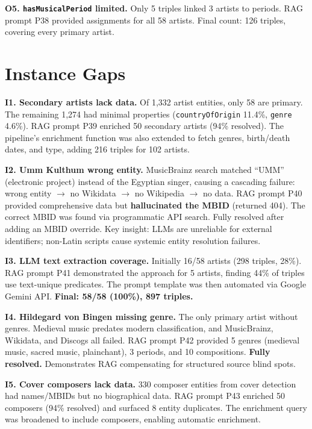 \documentclass[11pt,a4paper]{article}
\begin{document}
\textbf{O5. \texttt{hasMusicalPeriod} limited.} Only 5 triples linked 3 artists to periods. RAG prompt P38 provided assignments for all 58 artists. Final count: 126 triples, covering every primary artist.

\section{Instance Gaps}

\textbf{I1. Secondary artists lack data.} Of 1,332 artist entities, only 58 are primary. The remaining 1,274 had minimal properties (\texttt{countryOfOrigin} 11.4\%, \texttt{genre} 4.6\%). RAG prompt P39 enriched 50 secondary artists (94\% resolved). The pipeline's enrichment function was also extended to fetch genres, birth/death dates, and type, adding 216 triples for 102 artists.

\textbf{I2. Umm Kulthum wrong entity.} MusicBrainz search matched ``UMM'' (electronic project) instead of the Egyptian singer, causing a cascading failure: wrong entity $\rightarrow$ no Wikidata $\rightarrow$ no Wikipedia $\rightarrow$ no data. RAG prompt P40 provided comprehensive data but \textbf{hallucinated the MBID} (returned 404). The correct MBID was found via programmatic API search. Fully resolved after adding an MBID override. Key insight: LLMs are unreliable for external identifiers; non-Latin scripts cause systemic entity resolution failures.

\textbf{I3. LLM text extraction coverage.} Initially 16/58 artists (298 triples, 28\%). RAG prompt P41 demonstrated the approach for 5 artists, finding 44\% of triples use text-unique predicates. The prompt template was then automated via Google Gemini API. \textbf{Final: 58/58 (100\%), 897 triples.}

\textbf{I4. Hildegard von Bingen missing genre.} The only primary artist without genres. Medieval music predates modern classification, and MusicBrainz, Wikidata, and Discogs all failed. RAG prompt P42 provided 5 genres (medieval music, sacred music, plainchant), 3 periods, and 10 compositions. \textbf{Fully resolved.} Demonstrates RAG compensating for structured source blind spots.

\textbf{I5. Cover composers lack data.} 330 composer entities from cover detection had names/MBIDs but no biographical data. RAG prompt P43 enriched 50 composers (94\% resolved) and surfaced 8 entity duplicates. The enrichment query was broadened to include composers, enabling automatic enrichment.
\end{document}
